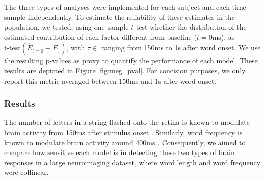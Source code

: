 The three types of analyses were implemented for each subject and each time
sample independently.  To estimate the reliability of these estimates in the
population, we tested, using one-sample $t$-test whether the distribution of
the estimated contribution of each factor different from baseline ($t=0$ms),
as $\text{t-test}(\hat E_{t=0} - \hat E_{\tau})$, with $\tau \in $ ranging from
150ms to 1s after word onset. We use the resulting p-values as proxy to quantify
the performance of each model. These results are depicted in Figure
\ref{fig:meg_pval}. For concision purposes, we only report this metric averaged
between 150ms and 1s after word onset.


\subsubsection{Results}
The number of letters in a string flashed onto the retina is known to modulate
brain activity from 150ms after stimulus onset \cite{pegado2014timing}.
Similarly, word frequency is known to modulate brain activity around 400ms \cite{kutas2011thirty}. Consequently, we aimed to compare how sensitive each
model is in detecting these two types of brain responses in a large
neuroimaging dataset, where word length and word frequency were collinear.


